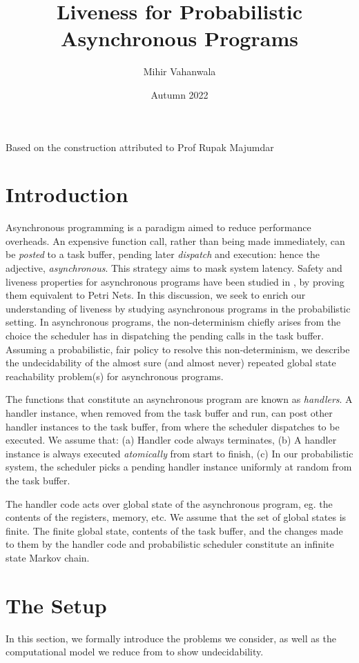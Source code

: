 \documentclass{article}
\title{Liveness for Probabilistic Asynchronous Programs}
\author{Mihir Vahanwala}
\date{Autumn 2022}
\theoremstyle{remark}
\begin{document}
\maketitle
Based on the construction attributed to Prof Rupak Majumdar
\section{Introduction}
Asynchronous programming is a paradigm aimed to reduce performance overheads. An expensive function call, rather than being made immediately, can be \textit{posted} to a task buffer, pending later \textit{dispatch} and execution: hence the adjective, \textit{asynchronous}. This strategy aims to mask system latency. Safety and liveness properties for asynchronous programs have been studied in \cite{asyncalgo2012}, by proving them equivalent to Petri Nets. In this discussion, we seek to enrich our understanding of liveness by studying asynchronous programs in the probabilistic setting. In asynchronous programs, the non-determinism chiefly arises from the choice the scheduler has in dispatching the pending calls in the task buffer. Assuming a probabilistic, fair policy to resolve this non-determinism, we describe the undecidability of the almost sure (and almost never) repeated global state reachability problem(s) for asynchronous programs.

The functions that constitute an asynchronous program are known as \textit{handlers}. A handler instance, when removed from the task buffer and run, can post other handler instances to the task buffer, from where the scheduler dispatches to be executed. We assume that: (a) Handler code always terminates, (b) A handler instance is always executed \textit{atomically} from start to finish, (c) In our probabilistic system, the scheduler picks a pending handler instance uniformly at random from the task buffer.

The handler code acts over global state of the asynchronous program, eg. the contents of the registers, memory, etc. We assume that the set of global states is finite. The finite global state, contents of the task buffer, and the changes made to them by the handler code and probabilistic scheduler constitute an infinite state Markov chain.

\section{The Setup}
In this section, we formally introduce the problems we consider, as well as the computational model we reduce from to show undecidability. 
\end{document}
